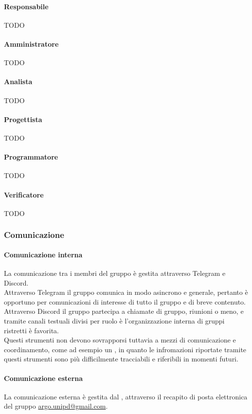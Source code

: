 \paragraph{Responsabile}
TODO
\paragraph{Amministratore}
TODO
\paragraph{Analista}
TODO
\paragraph{Progettista}
TODO
\paragraph{Programmatore}
TODO
\paragraph{Verificatore}
TODO

\subsubsection{Comunicazione}
\paragraph{Comunicazione interna}
La comunicazione tra i membri del gruppo è gestita attraverso Telegram e Discord.\\
Attraverso Telegram il gruppo comunica in modo asincrono e generale, pertanto è opportuno per comunicazioni di interesse di tutto il gruppo e di breve contenuto.\\
Attraverso Discord il gruppo partecipa a chiamate di gruppo, riunioni o meno, e tramite canali testuali divisi per ruolo è l'organizzazione interna di gruppi ristretti è favorita.\\
Questi strumenti non devono sovrapporsi tuttavia a mezzi di comunicazione e coordinamento, come ad esempio un , in quanto le infromazioni riportate tramite questi strumenti sono più difficilmente tracciabili e riferibili in momenti futuri.

\paragraph{Comunicazione esterna}
La comunicazione esterna è gestita dal \Responsabile, attraverso il recapito di posta elettronica del gruppo \href{mailto:argo.unipd@gmail.com}{argo.unipd@gmail.com}.